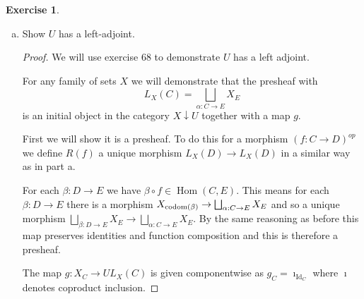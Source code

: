 \documentclass{article}
\DeclareMathOperator{\Id}{Id}
\DeclareMathOperator{\Hom}{Hom}
\theoremstyle{definition}
\newtheorem{question}{Exercise}
\begin{document}
\begin{question}
\begin{enumerate}[(a)]
\begin{proof}
                  This means that \(\tilde{f}\) is the unique morphism with this
                  property and so \(U\) must have a right-adjoint.
              \end{proof}

        \item Show \(U\) has a left-adjoint.

              \begin{proof}
                  We will use exercise 68 to demonstrate \(U\) has a left
                  adjoint.

                  For any family of sets \(X\) we will demonstrate that the
                  presheaf with
                  \[
                      L_{X}(C)=\bigsqcup_{\alpha:C\to E}X_{E}
                  \]
                  is an initial object in the category \(X\downarrow U\)
                  together with a map \(g\).

                  First we will show it is a presheaf. To do this for a morphism
                  \((f:C\to D)^{op}\) we define \(R(f)\) a unique morphism
                  \(L_{X}(D)\to L_{X}(D)\) in a similar way as in part a.

                  For each \(\beta:D\to E\) we have \(\beta\circ
                  f\in\Hom(C,E)\). This means for each \(\beta:D\to E\) there is
                  a morphism \(X_{\operatorname{codom}(\beta)}\to\bigsqcup_{\alpha:C\to
                      E}X_{E}\) and so a unique morphism \(\bigsqcup_{\beta:D\to
                      E}X_{E}\to \bigsqcup_{\alpha:C\to E}X_{E}\). By the same
                  reasoning as before this map preserves identities and function
                  composition and this is therefore a presheaf.

                  The map \(g:X_{C}\to U L_{X}(C)\) is given componentwise as
                  \(g_{C}=\imath_{\Id_{C}}\) where \(\imath\) denotes coproduct
                  inclusion.


\end{proof}
\end{enumerate}
\end{question}
\end{document}
